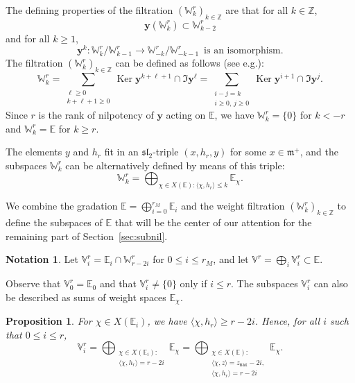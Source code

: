 \documentclass[10pt]{amsart}
\theoremstyle{plain}
\newtheorem{prop}[theo]{Proposition}
\theoremstyle{definition}
\newtheorem{nota}[theo]{Notation}
\let\rgy r
\DeclareMathOperator{\Ker}{Ker}
\newcommand{\bE}{\mathbb{E}}
\newcommand{\bZ}{\mathbb{Z}}
\newcommand{\Vr}{\mathbb{V}^\rgy}
\newcommand{\Wr}{\mathbb{W}^\rgy}
\newcommand{\by}{\boldsymbol{y}}
\newcommand{\fm}{\mathfrak{m}}
\newcommand{\fsl}{\mathfrak{sl}}
\newcommand{\zmax}{z_{\mathtt{max}}}
\newcommand{\rkm}{{r_M}}
\newcommand{\scal}[1]{\langle #1 \rangle}
\providecommand{\eg}{e.g.}\providecommand{\ie}{i.e.}\providecommand{\etc}{etc.}\providecommand{\resp}{resp.}\providecommand{\cf}{cf.}
\begin{document}
The defining properties of the filtration $(\Wr_k)_{k\in\bZ}$ are that for all $k\in\bZ$,
$$
\by(\Wr_k)\subset\Wr_{k-2}
$$
and for all $k\geq 1$,
\begin{equation}
\label{equa:deligne}
\by^k:\Wr_k/\Wr_{k-1}\to\Wr_{-k}/\Wr_{-k-1}\,\mbox{ is an isomorphism.}
\end{equation}
The filtration $(\Wr_k)_{k\in\bZ}$ can be defined as follows (see \eg \cite{SteenbrinkZucker}):
\begin{equation}
\label{equa:filtration-y}
\Wr_k=\sum_{\substack{\ell \geq 0 \\ k+\ell+1 \geq 0}}
\Ker \by^{k+\ell+1} \cap \Im \by^\ell = \sum_{\substack{i-j=k \\
i\geq 0,\, j\geq 0}}
\Ker \by^{i+1} \cap \Im \by^j.
\end{equation}
Since $\rgy$ is the rank of nilpotency of $\by$ acting on $\bE$, we have $\Wr_{k}=\{0\}$ for $k<-\rgy$ and $\Wr_k=\bE$ for $k\geq \rgy$.

The elements $y$ and $h_\rgy$ fit in an $\fsl_2$-triple $(x,h_\rgy,y)$ for some $x\in\fm^+$, and the subspaces $\Wr_k$ can be alternatively defined by means of this triple:
\begin{equation}
\label{equa:filtration-poids}
\Wr_k=\bigoplus_{\chi \in X(\bE) : \scal{\chi,h_\rgy}\leq k}\bE_\chi.
\end{equation}

We combine the gradation $\bE=\bigoplus_{i=0}^\rkm \bE_i$ and the weight filtration $(\Wr_k)_{k\in\bZ}$
to define the subspaces of $\bE$ that will be the center of our attention for the remaining part of
Section~\ref{sec:subnil}.

\begin{nota}\label{defi:V}
Let $\Vr_i=\bE_i\cap\Wr_{r-2i}$ for $0\leq i\leq \rkm$,
and let $\Vr=\bigoplus_i\Vr_i\subset\bE$.
\end{nota}

Observe that $\Vr_0=\bE_0$ and that $\Vr_i\neq\{0\}$ only if $i\leq r$. The subspaces $\Vr_i$ can also be described as sums of weight spaces $\bE_\chi$.

\begin{prop}\label{prop:chi-Ei}
For $\chi\!\in\!X(\bE_i)$, we have $\scal{\chi, h_\rgy}\!\geq\!\rgy - 2i$. Hence, for all $i$ such that $0\leq i\leq r$,
$$
\Vr_i=\bigoplus_{\substack{\chi\in X(\bE_i):\\\scal{\chi,h_\rgy}=r-2i}}\bE_\chi=\bigoplus_{\substack{\chi\in X(\bE):\\ \scal{\chi,z}=\zmax-2i,\\\scal{\chi,h_\rgy}=r-2i}}\bE_\chi.
$$
\end{prop}
\end{document}
